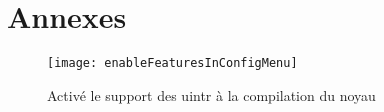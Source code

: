 \newpage

\section{Annexes}

\begin{figure}[H]
  \texttt{[image: enableFeaturesInConfigMenu]}
  \caption{Activé le support des uintr à la compilation du noyau}
  \label{fig:enableFeaturesInConfigMenu}
\end{figure}